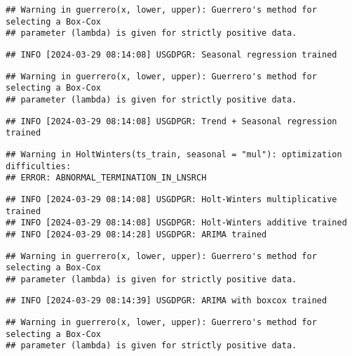 \documentclass[
]{article}
\begin{document}
\begin{verbatim}
## Warning in guerrero(x, lower, upper): Guerrero's method for selecting a Box-Cox
## parameter (lambda) is given for strictly positive data.
\end{verbatim}

\begin{verbatim}
## INFO [2024-03-29 08:14:08] USGDPGR: Seasonal regression trained
\end{verbatim}

\begin{verbatim}
## Warning in guerrero(x, lower, upper): Guerrero's method for selecting a Box-Cox
## parameter (lambda) is given for strictly positive data.
\end{verbatim}

\begin{verbatim}
## INFO [2024-03-29 08:14:08] USGDPGR: Trend + Seasonal regression trained
\end{verbatim}

\begin{verbatim}
## Warning in HoltWinters(ts_train, seasonal = "mul"): optimization difficulties:
## ERROR: ABNORMAL_TERMINATION_IN_LNSRCH
\end{verbatim}

\begin{verbatim}
## INFO [2024-03-29 08:14:08] USGDPGR: Holt-Winters multiplicative trained
## INFO [2024-03-29 08:14:08] USGDPGR: Holt-Winters additive trained
## INFO [2024-03-29 08:14:28] USGDPGR: ARIMA trained
\end{verbatim}

\begin{verbatim}
## Warning in guerrero(x, lower, upper): Guerrero's method for selecting a Box-Cox
## parameter (lambda) is given for strictly positive data.
\end{verbatim}

\begin{verbatim}
## INFO [2024-03-29 08:14:39] USGDPGR: ARIMA with boxcox trained
\end{verbatim}

\begin{verbatim}
## Warning in guerrero(x, lower, upper): Guerrero's method for selecting a Box-Cox
## parameter (lambda) is given for strictly positive data.
\end{verbatim}
\end{document}
